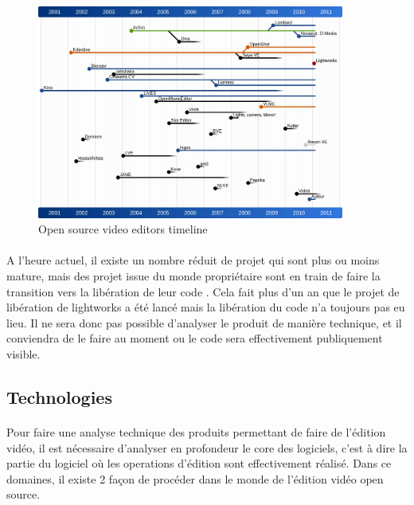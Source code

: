 \newpage
\begin{figure}
  \begin{center}
    \includegraphics[width=0.9\textwidth]{images/open-source-video-editor-timeline}
  \end{center} \caption{Open source video editors timeline} \label{Yes}
\end{figure}

\paragraph{} A l'heure actuel, il existe un nombre réduit de projet qui
sont plus ou moins mature, mais des projet issue du monde propriétaire
sont en train de faire la transition vers la libération de leur code
\cite{TheLightworksOpenSourceProjectStartHere}. Cela fait plus d'un an que
le projet de libération de lightworks a été lancé mais la libération
du code n'a toujours pas eu lieu. Il ne sera donc pas possible d'analyser
le produit de manière technique, et il conviendra de le faire au moment
ou le code sera effectivement publiquement visible.

\subsection{Technologies} \paragraph{} Pour faire une analyse technique
des produits permettant de faire de l'édition vidéo, il est nécessaire
d'analyser en profondeur le core des logiciels, c'est à dire la partie du
logiciel où les operations d'édition sont effectivement réalisé. Dans
ce domaines, il existe 2 façon de procéder dans le monde de l'édition
vidéo open source.

